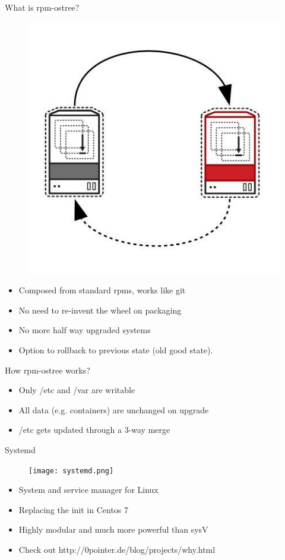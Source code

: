 \documentclass{beamer}
\begin{document}
\begin{frame}{What is rpm-ostree?}
\begin{figure}[htp]
\centering
\includegraphics[scale=0.25]{ostree.jpg}
\label{}
\end{figure}
\begin{itemize}
  \item Composed from standard rpms, works like git
  \item No need to re-invent the wheel on packaging
  \item No more half way upgraded systems
  \item Option to rollback to previous state (old good state).
\end{itemize}
\end{frame}

\begin{frame}{How rpm-ostree works?}
\begin{itemize}
  \item Only /etc and /var are writable
  \item All data (e.g. containers) are unchanged on upgrade
  \item /etc gets updated through a 3-way merge
\end{itemize}
\end{frame}

\begin{frame}{Systemd}
\begin{figure}[htp]
\centering
\texttt{[image: systemd.png]}
\label{}
\end{figure}
\begin{itemize}
  \item System and service manager for Linux 
  \item Replacing the init in Centos 7
  \item Highly modular and much more powerful than sysV
  \item Check out http://0pointer.de/blog/projects/why.html
\end{itemize}
\end{frame}
\end{document}
